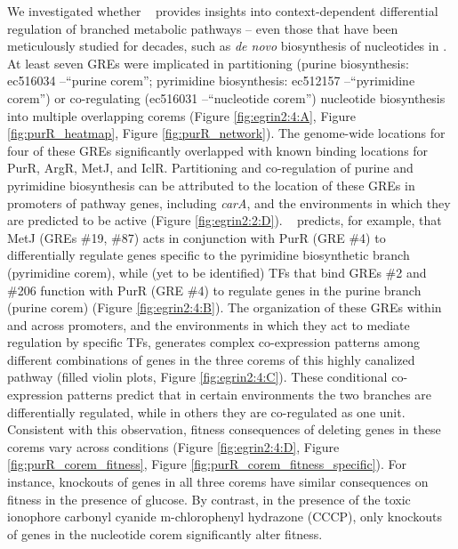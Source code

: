 We investigated whether \egrine~ provides insights into context-dependent  differential regulation of branched metabolic pathways – even those that have been meticulously studied for decades, such as \textit{de novo} biosynthesis of nucleotides in \eco \cite{neidhardt_escherichia_1996}. At least seven GREs were implicated in partitioning (purine biosynthesis: ec516034 –“purine corem”; pyrimidine biosynthesis: ec512157 –“pyrimidine corem”) or co-regulating (ec516031 –“nucleotide corem”) nucleotide biosynthesis into multiple overlapping corems (Figure \ref{fig:egrin2:4:A}, Figure \ref{fig:purR_heatmap}, Figure \ref{fig:purR_network}). The genome-wide locations for four of these GREs significantly overlapped with known binding locations for PurR, ArgR, MetJ, and IclR. Partitioning and co-regulation of purine and pyrimidine biosynthesis can be attributed to the location of these GREs in promoters of pathway genes, including \textit{carA}, and the environments in which they are predicted to be active (Figure \ref{fig:egrin2:2:D}). \egrine~ predicts, for example, that MetJ (GREs \#19, \#87) acts in conjunction with PurR (GRE \#4) to differentially regulate genes specific to the pyrimidine biosynthetic branch (pyrimidine corem), while (yet to be identified) TFs that bind GREs \#2 and \#206 function with PurR (GRE \#4) to regulate genes in the purine branch (purine corem) (Figure \ref{fig:egrin2:4:B}). The organization of these GREs within and across promoters, and the environments in which they act to mediate regulation by specific TFs, generates complex co-expression patterns among different combinations of genes in the three corems of this highly canalized pathway (filled violin plots, Figure \ref{fig:egrin2:4:C}). These conditional co-expression patterns predict that in certain environments the two branches are differentially regulated, while in others they are co-regulated as one unit. Consistent with this observation, fitness consequences of deleting genes in these corems vary across conditions (Figure \ref{fig:egrin2:4:D}, Figure \ref{fig:purR_corem_fitness}, Figure \ref{fig:purR_corem_fitness_specific}). For instance, knockouts of genes in all three corems have similar consequences on fitness in the presence of glucose. By contrast, in the presence of the toxic ionophore carbonyl cyanide m-chlorophenyl hydrazone (CCCP), only knockouts of genes in the nucleotide corem significantly alter fitness.

